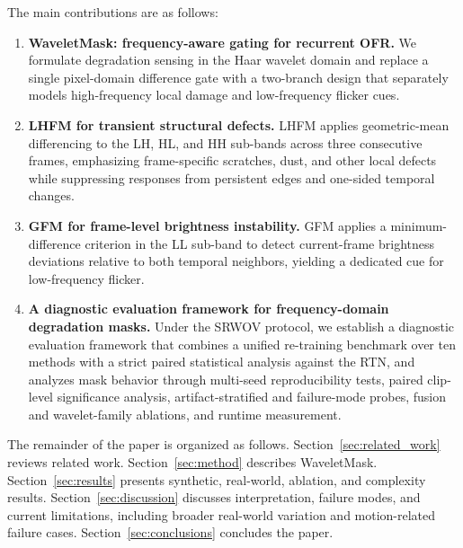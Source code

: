 The main contributions are as follows:
\begin{enumerate}
    \item \textbf{WaveletMask: frequency-aware gating for recurrent OFR.} We formulate degradation sensing in the Haar wavelet domain and replace a single pixel-domain difference gate with a two-branch design that separately models high-frequency local damage and low-frequency flicker cues.

    \item \textbf{LHFM for transient structural defects.} LHFM applies geometric-mean differencing to the LH, HL, and HH sub-bands across three consecutive frames, emphasizing frame-specific scratches, dust, and other local defects while suppressing responses from persistent edges and one-sided temporal changes.

    \item \textbf{GFM for frame-level brightness instability.} GFM applies a minimum-difference criterion in the LL sub-band to detect current-frame brightness deviations relative to both temporal neighbors, yielding a dedicated cue for low-frequency flicker.

    \item \textbf{A diagnostic evaluation framework for frequency-domain degradation masks.} Under the SRWOV protocol, we establish a diagnostic evaluation framework that combines a unified re-training benchmark over ten methods with a strict paired statistical analysis against the RTN, and analyzes mask behavior through multi-seed reproducibility tests, paired clip-level significance analysis, artifact-stratified and failure-mode probes, fusion and wavelet-family ablations, and runtime measurement.
\end{enumerate}

The remainder of the paper is organized as follows. Section~\ref{sec:related_work} reviews related work. Section~\ref{sec:method} describes WaveletMask. Section~\ref{sec:results} presents synthetic, real-world, ablation, and complexity results. Section~\ref{sec:discussion} discusses interpretation, failure modes, and current limitations, including broader real-world variation and motion-related failure cases. Section~\ref{sec:conclusions} concludes the paper.
